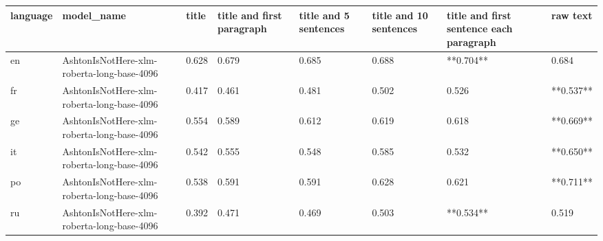 \begin{tabular}{llllllll}
\toprule
language &                                 model\_name & title & title and first paragraph & title and 5 sentences & title and 10 sentences & title and first sentence each paragraph &  raw text \\
\midrule
      en & AshtonIsNotHere-xlm-roberta-long-base-4096 & 0.628 &                     0.679 &                 0.685 &                  0.688 &                               **0.704** &     0.684 \\
      fr & AshtonIsNotHere-xlm-roberta-long-base-4096 & 0.417 &                     0.461 &                 0.481 &                  0.502 &                                   0.526 & **0.537** \\
      ge & AshtonIsNotHere-xlm-roberta-long-base-4096 & 0.554 &                     0.589 &                 0.612 &                  0.619 &                                   0.618 & **0.669** \\
      it & AshtonIsNotHere-xlm-roberta-long-base-4096 & 0.542 &                     0.555 &                 0.548 &                  0.585 &                                   0.532 & **0.650** \\
      po & AshtonIsNotHere-xlm-roberta-long-base-4096 & 0.538 &                     0.591 &                 0.591 &                  0.628 &                                   0.621 & **0.711** \\
      ru & AshtonIsNotHere-xlm-roberta-long-base-4096 & 0.392 &                     0.471 &                 0.469 &                  0.503 &                               **0.534** &     0.519 \\
\bottomrule
\end{tabular}
